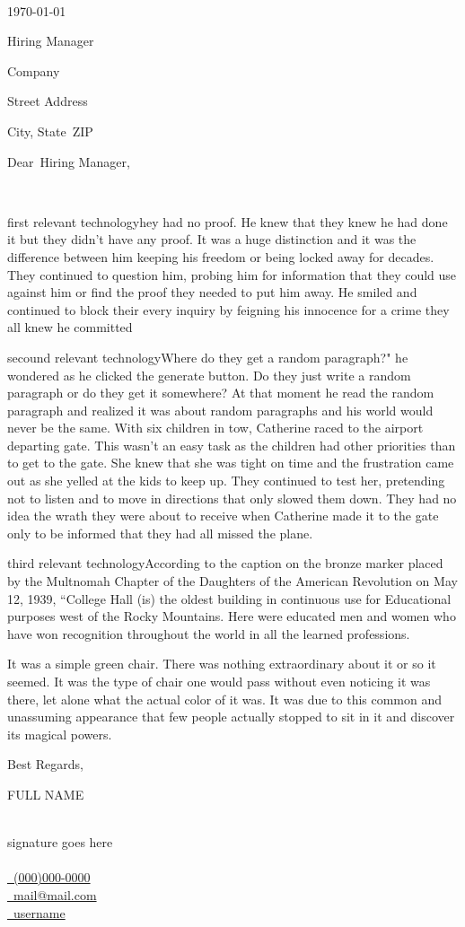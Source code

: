 \documentclass[a4paper,11pt]{article}
\makeatletter
\newcommand{\firstrelevanttechnology}{first relevant technology} %
\newcommand{\secondrelevanttechnology}{secound relevant technology} %
\newcommand{\thirdrelevanttechnology}{third relevant technology} %
\newcommand{\company}{Company} 		%
\newcommand{\street}{Street Address}	%
\newcommand{\city}{City} 				%
\newcommand{\state}{State}			    %
\newcommand{\zip}{ZIP} %
\newcommand{\Name}{\begin{Huge}FULL NAME\end{Huge}}
\newcommand{\Phone}{\href{tel:(000)000-000}{\faPhone\ (000)000-0000}}
\newcommand{\Email}{\href{mailto:mail@mail.com}{\faEnvelope\ mail@mail.com}}
\newcommand{\LinkedInURL}{\href{https://www.linkedin.com/in/username/}{\faLinkedin\ username}}
\newcommand{\recipient}{Hiring Manager}  %
\newcommand{\greeting}{Dear}			   %
\newcommand{\closer}{Best Regards} 	   %
\newcommand{\FirstParagraph}{\firstrelevanttechnology hey had no proof. He knew that they knew he had done it but they
 didn't have any proof. It was a huge distinction and it was the difference between him keeping his freedom or
 being locked away for decades. They continued to question him, probing him for information that they could use
 against him or find the proof they needed to put him away. He smiled and continued to block their every inquiry by
 feigning his innocence for a crime they all knew he committed}
\newcommand{\SecondParagraph}{\secondrelevanttechnology Where do they get a random paragraph?" he wondered as he clicked the generate button.
Do they just write a random paragraph or do they get it somewhere? At that moment he read the random paragraph and
realized it was about random paragraphs and his world would never be the same. With six children in tow, Catherine
raced to the airport departing gate. This wasn't an easy task as the children had other priorities than to get to
the gate. She knew that she was tight on time and the frustration came out as she yelled at the kids to keep up.
They continued to test her, pretending not to listen and to move in directions that only slowed them down. They
had no idea the wrath they were about to receive when Catherine made it to the gate only to be informed that
they had all missed the plane. }
\newcommand{\ThirdParagraph}{\thirdrelevanttechnology According to the caption on the bronze marker placed by the Multnomah Chapter of the
 Daughters of the American Revolution on May 12, 1939, “College Hall (is) the oldest building in continuous use for
 Educational purposes west of the Rocky Mountains. Here were educated men and women who have won recognition throughout
  the world in all the learned professions.}
\newcommand{\FourthParagraph}{ It was a simple green chair. There was nothing extraordinary
 about it or so it seemed. It was the type of chair one would pass without even noticing it was there, let alone what
 the actual color of it was. It was due to this common and unassuming appearance that few people actually stopped to
 sit in it and discover its magical powers. }
\newcommand{\body}{
\hspace{0.5 in}

\FirstParagraph  %

\hspace{0.15 in}

\SecondParagraph %

\hspace{0.15 in}

\ThirdParagraph  %

\hspace{0.15 in}

\FourthParagraph %
}
\makeatother
\begin{document}
\begin{flushleft}
\hrulefill\\
\vspace{0.2in}

\today\\

\vspace{0.15in}

\recipient

\company

\street

\city, \state\ \zip\\

\vspace{0.15in}

\greeting\ \recipient,\\

\end{flushleft}


\vspace{-0.1in}
\setlength
\parindent{24pt}
\noindent\ \body\


\begin{flushleft}
\closer,
\vspace{0.15in}

\Name\\
signature goes here\\
\hrulefill\\
\Phone\hfill\\
\Email\hfill\\
\LinkedInURL\hfill\\
\hrulefill\\

\end{flushleft}
\end{document}
